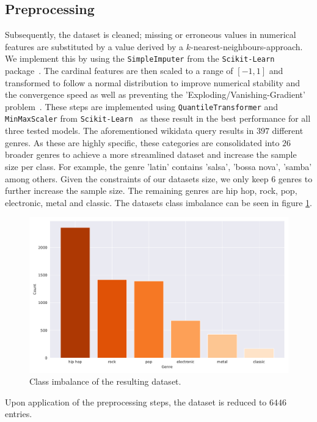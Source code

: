 \documentclass[
  12pt,
  bibliography=totoc,     %
  captions=tableheading,  %
  titlepage=firstiscover, %
]{scrartcl}
\begin{document}
\subsection{Preprocessing}
Subsequently, the dataset is cleaned; missing or erroneous values
in numerical features are substituted by a value derived by a $k$-nearest-neighbours-approach. We implement this
by using the \texttt{SimpleImputer} from the \texttt{Scikit-Learn} package~\cite{scikit-learn}.
The cardinal features are then scaled to a range of $[-1,1]$ and transformed to follow a normal distribution to improve numerical stability
and the convergence speed as well as preventing the 'Exploding/Vanishing-Gradient' problem~\cite{geron}. These steps are implemented using \texttt{QuantileTransformer} and
\texttt{MinMaxScaler} from \texttt{Scikit-Learn}~\cite{scikit-learn} as these result in the best performance for all three tested models.
The aforementioned wikidata query results in $397$ different genres. As these are highly specific, these categories are consolidated into $26$ broader genres to
achieve a more streamlined dataset and increase the sample size per class. For example, the genre 'latin' contains 'salsa', 'bossa nova', 'samba' among others.
Given the constraints of our datasets size, we only keep $6$ genres to further increase the sample
size. The remaining genres are hip hop, rock, pop, electronic, metal and classic. The datasets class imbalance can be seen in figure \ref{fig:class-imbalance}.
\FloatBarrier
\begin{figure}[h]
  \centering
  \includegraphics[scale=0.6]{figures/genre_hist_oranges.pdf}
  \caption{Class imbalance of the resulting dataset.}
  \label{fig:class-imbalance}
\end{figure}
\FloatBarrier
\noindent
Upon application of the preprocessing steps, the dataset is reduced to $6446$ entries.
\end{document}

